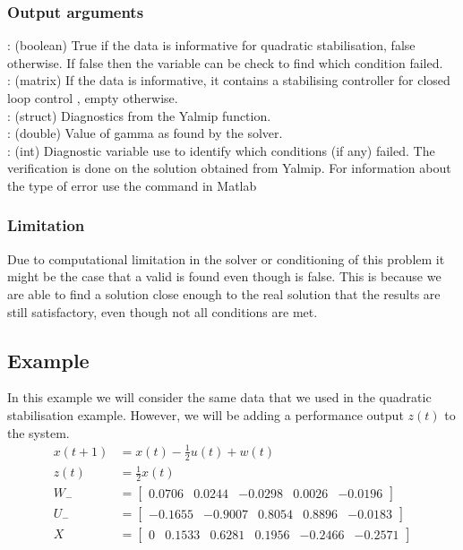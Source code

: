 \subsubsection*{Output arguments}
\textbf{}: (boolean) True if the data is informative for quadratic stabilisation, false otherwise. If false then the  variable can be check to find which condition failed. \\
\textbf{}: (matrix) If the data is informative, it contains a stabilising controller  for closed loop control , empty otherwise.\\
\textbf{}: (struct) Diagnostics from the Yalmip  function. \\
\textbf{}: (double) Value of gamma as found by the solver. \\
\textbf{}: (int) Diagnostic variable use to identify which conditions (if any) failed. The verification is done on the solution obtained from Yalmip. For information about the type of error use the  command in Matlab

\subsubsection*{Limitation}
Due to computational limitation in the solver or conditioning of this problem it might be the case that a valid  is found even though  is false. This is because we are able to find a solution close enough to the real solution that the results are still satisfactory, even though not all conditions are met. 

\subsection{Example} \label{ExampleH2}
In this example we will consider the same data that we used in the quadratic stabilisation example. However, we will be adding a performance output $z(t)$ to the system.
\begin{align*}
	x(t+1) &= x(t) - \frac{1}{2}u(t) + w(t) \\
	z(t)   &= \frac{1}{2}x(t) \\
	W_- &= \begin{bmatrix}  0.0706 &  0.0244 & -0.0298 & 0.0026 & -0.0196 \end{bmatrix} \\
	U_- &= \begin{bmatrix} -0.1655 & -0.9007 &  0.8054 & 0.8896 & -0.0183 \end{bmatrix} \\
	X   &= \begin{bmatrix}     0   &  0.1533 &  0.6281 & 0.1956 & -0.2466 & -0.2571 \end{bmatrix} \\
\end{align*}


